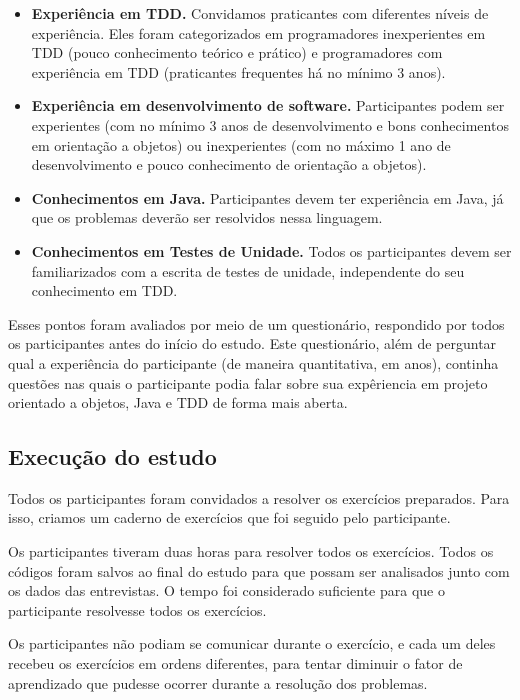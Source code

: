 \documentclass[conference]{IEEEtran}
\begin{document}
\begin{itemize}
	\item \textbf{Experiência em TDD.} Convidamos praticantes com diferentes
	níveis de experiência. Eles foram categorizados em programadores inexperientes em TDD (pouco conhecimento teórico e prático)
	e programadores com experiência em TDD (praticantes frequentes há no mínimo 3 anos).
	
	\item \textbf{Experiência em desenvolvimento de software.} Participantes podem ser
	experientes (com no mínimo 3 anos de desenvolvimento e bons conhecimentos em orientação a objetos) ou 
	inexperientes (com no máximo 1 ano de desenvolvimento e pouco conhecimento de orientação a objetos).

	\item \textbf{Conhecimentos em Java.} 
	Participantes devem ter experiência em Java, já que os problemas deverão ser resolvidos
	nessa linguagem.	
	
	\item \textbf{Conhecimentos em Testes de Unidade.} Todos os participantes devem ser
	familiarizados com a escrita de testes de unidade, independente do seu conhecimento
	em TDD.

\end{itemize}

Esses pontos foram avaliados por meio de um questionário, 
respondido por todos os participantes antes do início do estudo. 
Este questionário, além de perguntar qual a experiência
do participante (de maneira quantitativa, em anos), 
continha questões nas quais o participante
podia falar sobre sua expêriencia em projeto orientado a objetos,
Java e TDD de forma mais aberta.


\subsection{Execução do estudo}
\label{sec:execucao}	

Todos os participantes foram convidados a resolver os exercícios preparados. 
Para isso, criamos um caderno de exercícios que foi seguido pelo participante.

Os participantes tiveram duas horas para resolver todos os exercícios. 
Todos os códigos foram salvos ao final do estudo para que possam ser analisados junto
com os dados das entrevistas.
O tempo foi considerado suficiente para que o participante resolvesse todos os
exercícios. 

Os participantes não podiam se comunicar durante o exercício, e cada um deles recebeu
os exercícios em ordens diferentes, para tentar diminuir o fator de aprendizado que 
pudesse ocorrer durante a resolução dos problemas. 
\end{document}
